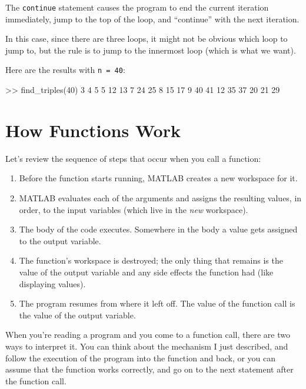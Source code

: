 The \lstinline{continue} statement  causes the program to end the current iteration
immediately, jump to the top of the loop, and ``continue'' with the next iteration.

In this case, since there are three loops, it might not be obvious which loop to jump to, but the rule is to jump to the innermost loop (which is what we want).

Here are the results with \lstinline{n = 40}:

\begin{code}
>> find_triples(40)
     3     4     5
     5    12    13
     7    24    25
     8    15    17
     9    40    41
    12    35    37
    20    21    29
\end{code}


\section{How Functions Work}

Let's review the sequence of steps that occur when you call a function:

\begin{enumerate}

\item Before the function starts running, MATLAB creates a new
workspace for it.

\item MATLAB evaluates each of the arguments and assigns
the resulting values, in order, to the input variables (which
live in the \emph{new} workspace).

\item The body of the code executes.  Somewhere in the body
a value gets assigned to the output variable.

\item The function's workspace is destroyed; the only thing
that remains is the value of the output variable and any side
effects the function had (like displaying values).

\item The program resumes from where it left off.  The value
of the function call is the value of the output variable.

\end{enumerate}

When you're reading a program and you come to a function call,
there are two ways to interpret it. You can think about the mechanism I just described,
and follow the execution of the program into the function and back, or you can assume that the function works correctly, and go on to the next statement after the function call.

